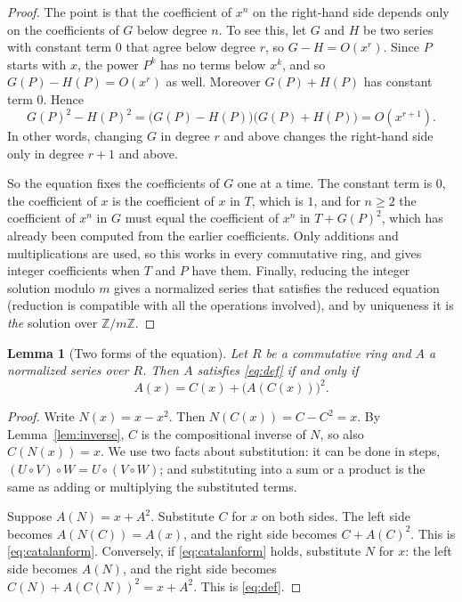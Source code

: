 \documentclass[11pt,a4paper]{article}
\newtheorem{lemma}[theorem]{Lemma}
\theoremstyle{definition}
\theoremstyle{remark}
\newcommand{\Z}{\mathbb{Z}}
\begin{document}
\begin{proof}
The point is that the coefficient of $x^n$ on the right-hand side depends only on the coefficients of $G$ below degree
$n$. To see this, let $G$ and $H$ be two series with constant term $0$ that agree below degree $r$, so $G-H=O(x^r)$.
Since $P$ starts with $x$, the power $P^k$ has no terms below $x^k$, and so $G(P)-H(P)=O(x^r)$ as well. Moreover
$G(P)+H(P)$ has constant term $0$. Hence
\[
G(P)^2-H(P)^2=\bigl(G(P)-H(P)\bigr)\bigl(G(P)+H(P)\bigr)=O(x^{r+1}).
\]
In other words, changing $G$ in degree $r$ and above changes the right-hand side only in degree $r+1$ and above.

So the equation fixes the coefficients of $G$ one at a time. The constant term is $0$, the coefficient of $x$ is the
coefficient of $x$ in $T$, which is $1$, and for $n\ge2$ the coefficient of $x^n$ in $G$ must equal the coefficient of
$x^n$ in $T+G(P)^2$, which has already been computed from the earlier coefficients. Only additions and multiplications
are used, so this works in every commutative ring, and gives integer coefficients when $T$ and $P$ have them. Finally,
reducing the integer solution modulo $m$ gives a normalized series that satisfies the reduced equation (reduction is
compatible with all the operations involved), and by uniqueness it is \emph{the} solution over $\Z/m\Z$.
\end{proof}

\begin{lemma}[Two forms of the equation]\label{lem:forms}
Let $R$ be a commutative ring and $A$ a normalized series over $R$. Then $A$ satisfies \eqref{eq:def} if and only if
\begin{equation}\label{eq:catalanform}
A(x)=C(x)+\bigl(A(C(x))\bigr)^2 .
\end{equation}
\end{lemma}

\begin{proof}
Write $N(x)=x-x^2$. Then $N(C(x))=C-C^2=x$. By Lemma~\ref{lem:inverse}, $C$ is the compositional inverse of $N$, so also
$C(N(x))=x$. We use two facts about substitution: it can be done in steps, $(U\circ V)\circ W=U\circ(V\circ W)$;
and substituting into a sum or a product is the same as adding or multiplying the substituted terms.

Suppose $A(N)=x+A^2$. Substitute $C$ for $x$ on both sides. The left side becomes $A(N(C))=A(x)$, and the right side
becomes $C+A(C)^2$. This is \eqref{eq:catalanform}. Conversely, if \eqref{eq:catalanform} holds, substitute $N$ for $x$:
the left side becomes $A(N)$, and the right side becomes $C(N)+A(C(N))^2=x+A^2$. This is \eqref{eq:def}.
\end{proof}
\end{document}
